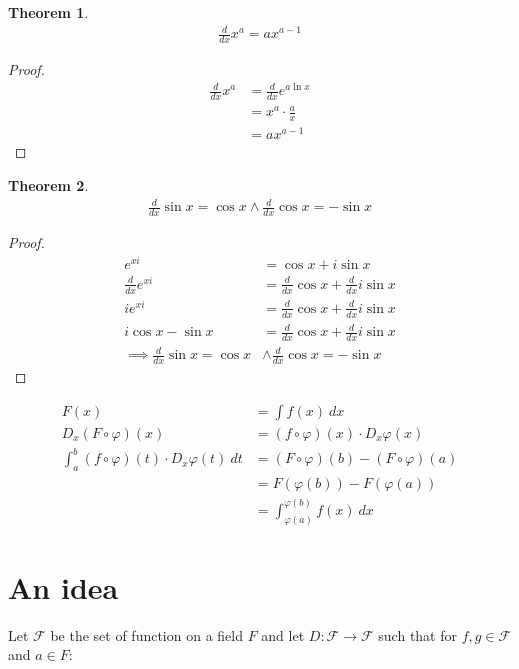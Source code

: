 \documentclass{article}
\newtheorem{theorem}{Theorem}[section]
\begin{document}
\begin{theorem}
\begin{align}
    \frac{d}{dx} x^a= ax^{a-1}
\end{align}
\end{theorem}
\begin{proof}
\begin{align}
    \frac{d}{dx} x^a &= \frac{d}{dx} e^{a \ln x} \\ \nonumber
                     &= x^a \cdot \frac{a}{x} \\ \nonumber
                     &= ax^{a-1} \nonumber
\end{align}
\end{proof}
\begin{theorem}
\begin{align}
    \frac{d}{dx} \sin x = \cos x \land \frac{d}{dx} \cos x = -\sin x
\end{align}
\end{theorem}
\begin{proof}
\begin{align}
    e^{xi} &= \cos x + i \sin x \\ \nonumber \frac{d}{dx} e^{xi} &=
    \frac{d}{dx} \cos x + \frac{d}{dx} i \sin x \\ \nonumber ie^{xi} &=
    \frac{d}{dx} \cos x + \frac{d}{dx} i \sin x \\ \nonumber i\cos x -
    \sin x &= \frac{d}{dx} \cos x + \frac{d}{dx} i \sin x \\ \nonumber
    \implies \frac{d}{dx} \sin x = \cos x &\land \frac{d}{dx} \cos x =
    -\sin x
\end{align}
\end{proof}

\begin{align*}
	F(x) &= \int f(x)\ dx \\
	D_x(F \circ \varphi)(x) &= (f \circ \varphi)(x) \cdot D_x\varphi(x) \\
	\int_a^b  (f \circ \varphi)(t) \cdot D_x\varphi(t)\ dt
	&= (F \circ \varphi)(b) - (F \circ \varphi)(a) \\
	&= F(\varphi(b)) - F(\varphi(a)) \\
	&= \int_{\varphi(a)}^{\varphi(b)} f(x)\ dx
\end{align*}

\section{An idea}
Let $\mathcal{F}$ be the set of function on a field $F$ and let $D:
\mathcal{F} \rightarrow \mathcal{F}$ such that for $f,g \in \mathcal{F}$
and $a \in F$:
\end{document}
